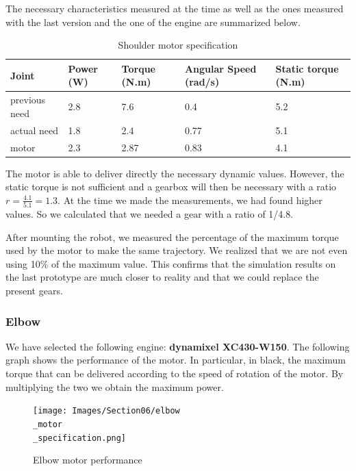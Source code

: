 \bigbreak
The necessary characteristics measured at the time as well as the ones measured with the last version and the one of the engine are summarized below.
\begin{table}[ht]
    \centering
    \begin{tabular}{|p{1.5cm} | p{2cm} | p{2.5cm}| p{2.7cm} | p{2.7cm} |} 
        \hline
        \textbf{Joint}& \textbf{Power (W)} & \textbf{Torque (N.m)} & \textbf{Angular Speed (rad/s)} & \textbf{Static torque (N.m)}\\ [0.3ex]
        \hline
        previous need & 2.8 & 7.6 & 0.4 & 5.2 \\ 
        \hline
        actual need & 1.8 & 2.4 & 0.77 & 5.1 \\ 
        \hline
        motor & 2.3 & 2.87 & 0.83 & 4.1\\ 
        \hline
    \end{tabular}
    \caption{Shoulder motor specification}
\end{table}
\FloatBarrier
The motor is able to deliver directly the necessary dynamic values. However, the static torque is not sufficient and a gearbox will then be necessary with a ratio $r=\frac{4.1}{5.1}=1.3$. At the time we made the measurements, we had found higher values. So we calculated that we needed a gear with a ratio of 1/4.8.

\bigbreak
After mounting the robot, we measured the percentage of the maximum torque used by the motor to make the same trajectory. We realized that we are not even using 10\% of the maximum value. This confirms that the simulation results on the last prototype are much closer to reality and that we could replace the present gears.

\subsubsection{Elbow}


 We have selected the following engine: \textbf{dynamixel XC430-W150}. The following graph shows the performance of the motor. In particular, in black, the maximum torque that can be delivered according to the speed of rotation of the motor. By multiplying the two we obtain the maximum power.
\begin{figure}[ht]
    \centering
    \texttt{[image: Images/Section06/elbow\\\_motor\\\_specification.png]}
    \caption{Elbow motor performance}
    \label{fig:ElbowMotor}
\end{figure}
\FloatBarrier

